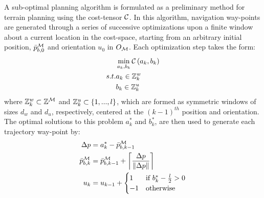 			A sub-optimal planning algorithm is formulated as a preliminary method for terrain planning using the cost-tensor ${\cal C}$. In this algorithm, navigation way-points are generated through a series of successive optimizations upon a finite window about a current location in the cost-space, starting from an arbitrary initial position, $\bar{p}^{{\cal M}}_{b,0}$ and orientation $u_{0}$ in $O_{{\cal M}}$. Each optimization step takes the form:
				\begin{eqnarray}
							&	\min_{a_{k},b_{k}}{\cal C}\left(a_{k},b_{k}\right) 	\nonumber\\
					s.t.	&	a_{k}\in{\Bbb Z}^{w}_{k}							\nonumber\\
							&	b_{k}\in{\Bbb Z}^{u}_{k}
				\end{eqnarray}
			where ${\Bbb Z}^{w}_{k}\subset{\Bbb Z}^{{\cal M}}$ and ${\Bbb Z}^{u}_{k}\subset\{1,...,l\}$, which are formed as symmetric windows of sizes $d_{w}$ and $d_{u}$, respectively, centered at the $(k-1)^{th}$ position and orientation. The optimal solutions to this problem $a_{k}^{*}$ and $b_{k}^{*}$, are then used to generate each \Kth trajectory way-point by:
				\begin{eqnarray}
					{\Delta p} &= a_{k}^{*}-\bar{p}^{{\cal M}}_{b,k-1} \nonumber\\
					\bar{p}^{{\cal M}}_{b,k} &= \bar{p}^{{\cal M}}_{b,k-1} + \left\lceil\frac{\Delta p}{\left\lVert\Delta p\right\rVert}\right\rceil \nonumber\\
					u_{k} & = u_{k-1} +
					\begin{cases}
						1 &	\text{if } b_{k}^{*}-\frac{l}{2} > 0 \\
					   -1 &	\text{otherwise}
					\end{cases}
				\end{eqnarray}

